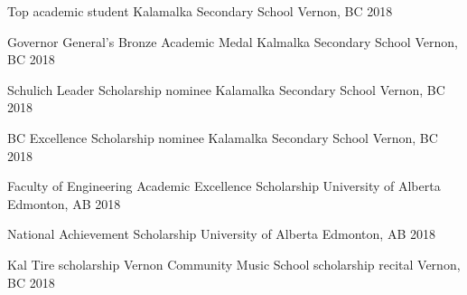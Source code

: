 



\begin{cvhonors}

  \cvhonor
    {Top academic student} %
    {Kalamalka Secondary School} %
    {Vernon, BC} %
    {2018} %

  \cvhonor
    {Governor General's Bronze Academic Medal}
    {Kalmalka Secondary School}
    {Vernon, BC}
    {2018}

\end{cvhonors}




\begin{cvhonors}

  \cvhonor
    {Schulich Leader Scholarship nominee} %
    {Kalamalka Secondary School} %
    {Vernon, BC} %
    {2018} %

  \cvhonor
    {BC Excellence Scholarship nominee}
    {Kalamalka Secondary School}
    {Vernon, BC}
    {2018}

  \cvhonor
    {Faculty of Engineering Academic Excellence Scholarship}
    {University of Alberta}
    {Edmonton, AB}
    {2018}

  \cvhonor
    {National Achievement Scholarship}
    {University of Alberta}
    {Edmonton, AB}
    {2018}

  \cvhonor
    {Kal Tire scholarship}
    {Vernon Community Music School scholarship recital}
    {Vernon, BC}
    {2018}

\end{cvhonors}
